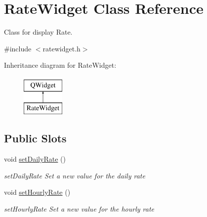 \hypertarget{classRateWidget}{\section{Rate\+Widget Class Reference}
\label{classRateWidget}
}


Class for display Rate.  




{\ttfamily \#include $<$ratewidget.\+h$>$}

Inheritance diagram for Rate\+Widget\+:\begin{figure}[H]
\begin{center}
\leavevmode
\includegraphics[height=2.000000cm]{dc/da5/classRateWidget}
\end{center}
\end{figure}
\subsection*{Public Slots}
\begin{DoxyCompactItemize}
\item 
void \hyperlink{classRateWidget_ae06885c9e58ed09e5a210a295bb3ffbb}{set\+Daily\+Rate} ()
\begin{DoxyCompactList}\small\item\em set\+Daily\+Rate Set a new value for the daily rate \end{DoxyCompactList}\item 
void \hyperlink{classRateWidget_af7b6ceb4d9ceb8efe84a497c7a42d048}{set\+Hourly\+Rate} ()
\begin{DoxyCompactList}\small\item\em set\+Hourly\+Rate Set a new value for the hourly rate \end{DoxyCompactList}\end{DoxyCompactItemize}
